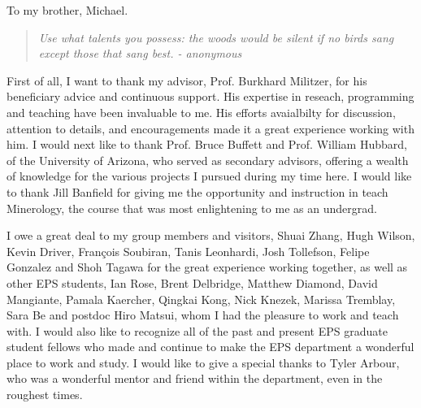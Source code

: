 \documentclass[phd,12pt]{ucbthesis}
\begin{document}
\begin{frontmatter}

\begin{dedication}
\null\vfil
\begin{center}
To my brother, Michael.\\\vspace{12pt}

\begin{quote}
    {\small\textit{Use what talents you possess: the woods would be silent if no
birds sang except those that sang best. - anonymous
}}
\end{quote}
\end{center}
\vfil\null
\end{dedication}


\tableofcontents
\clearpage
\listoffigures
\clearpage
\listoftables

\begin{acknowledgements}
First of all, I want to thank my advisor, Prof. Burkhard Militzer, for his
beneficiary advice and continuous support. His expertise in reseach, programming and
teaching have been invaluable to me. His efforts avaialbilty for discussion, attention to
details, and encouragements made it a great experience working with him.
I would next like to thank Prof. Bruce Buffett and Prof. William Hubbard, of the
University of Arizona, who served as secondary advisors, offering a wealth of
knowledge for the various projects I pursued during my time here. 
I would like to thank Jill Banfield for giving me the opportunity and instruction in
teach Minerology, the course that was most enlightening to me as an undergrad.

I owe a great deal to my group members and visitors, Shuai Zhang, Hugh Wilson, Kevin
Driver, Fran\c{c}ois Soubiran, Tanis Leonhardi, Josh Tollefson, Felipe Gonzalez and
Shoh Tagawa for the great experience working together, as well as other EPS students,
Ian Rose, Brent Delbridge, Matthew Diamond, David Mangiante, Pamala Kaercher, Qingkai
Kong, Nick Knezek, Marissa Tremblay, Sara Be and postdoc Hiro Matsui, whom I had the
pleasure to work and teach with.
I would also like to recognize all of the past and present EPS graduate student fellows who made
and continue to make the EPS department a wonderful place to work and study.
I would like to give a special thanks to Tyler Arbour, who was a wonderful mentor and
friend within the department, even in the roughest times.


\end{acknowledgements}
\end{frontmatter}
\end{document}
